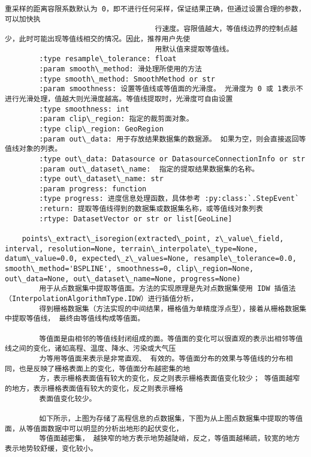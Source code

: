 \documentclass[11pt]{article}
\begin{document}
\begin{Verbatim}[commandchars=\\\{\}]
                                   重采样的距离容限系数默认为 0，即不进行任何采样，保证结果正确，但通过设置合理的参数，可以加快执
                                   行速度。容限值越大，等值线边界的控制点越少，此时可能出现等值线相交的情况。因此，推荐用户先使
                                   用默认值来提取等值线。
        :type resample\_tolerance: float
        :param smooth\_method: 滑处理所使用的方法
        :type smooth\_method: SmoothMethod or str
        :param smoothness: 设置等值线或等值面的光滑度。 光滑度为 0 或 1表示不进行光滑处理，值越大则光滑度越高。等值线提取时，光滑度可自由设置
        :type smoothness: int
        :param clip\_region: 指定的裁剪面对象。
        :type clip\_region: GeoRegion
        :param out\_data: 用于存放结果数据集的数据源。 如果为空，则会直接返回等值线对象的列表。
        :type out\_data: Datasource or DatasourceConnectionInfo or str
        :param out\_dataset\_name:  指定的提取结果数据集的名称。
        :type out\_dataset\_name: str
        :param progress: function
        :type progress: 进度信息处理函数，具体参考 :py:class:`.StepEvent`
        :return: 提取等值线得到的数据集或数据集名称，或等值线对象列表
        :rtype: DatasetVector or str or list[GeoLine]
    
    points\_extract\_isoregion(extracted\_point, z\_value\_field, interval, resolution=None, terrain\_interpolate\_type=None, datum\_value=0.0, expected\_z\_values=None, resample\_tolerance=0.0, smooth\_method='BSPLINE', smoothness=0, clip\_region=None, out\_data=None, out\_dataset\_name=None, progress=None)
        用于从点数据集中提取等值面。方法的实现原理是先对点数据集使用 IDW 插值法（InterpolationAlgorithmType.IDW）进行插值分析，
        得到栅格数据集（方法实现的中间结果，栅格值为单精度浮点型），接着从栅格数据集中提取等值线， 最终由等值线构成等值面。
        
        等值面是由相邻的等值线封闭组成的面。等值面的变化可以很直观的表示出相邻等值线之间的变化，诸如高程、温度、降水、污染或大气压
        力等用等值面来表示是非常直观、 有效的。等值面分布的效果与等值线的分布相同，也是反映了栅格表面上的变化，等值面分布越密集的地
        方，表示栅格表面值有较大的变化，反之则表示栅格表面值变化较少； 等值面越窄的地方，表示栅格表面值有较大的变化，反之则表示栅格
        表面值变化较少。
        
        如下所示，上图为存储了高程信息的点数据集，下图为从上图点数据集中提取的等值面，从等值面数据中可以明显的分析出地形的起伏变化，
        等值面越密集， 越狭窄的地方表示地势越陡峭，反之，等值面越稀疏，较宽的地方表示地势较舒缓，变化较小。
        

\end{Verbatim}
\end{document}
